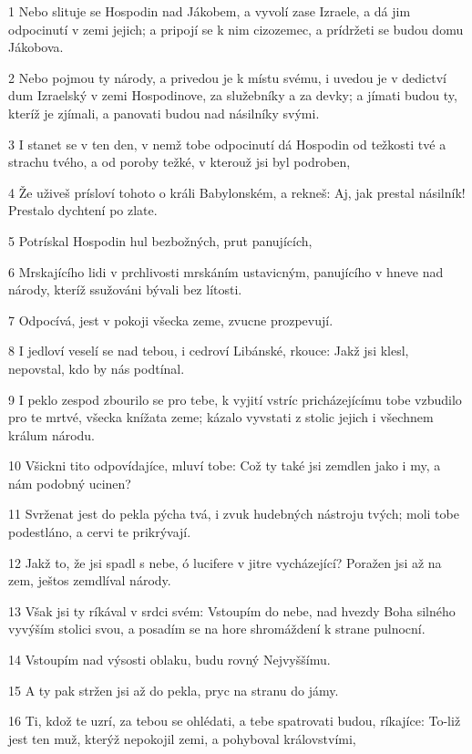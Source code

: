 \par 1 Nebo slituje se Hospodin nad Jákobem, a vyvolí zase Izraele, a dá jim odpocinutí v zemi jejich; a pripojí se k nim cizozemec, a prídržeti se budou domu Jákobova.
\par 2 Nebo pojmou ty národy, a privedou je k místu svému, i uvedou je v dedictví dum Izraelský v zemi Hospodinove, za služebníky a za devky; a jímati budou ty, kteríž je zjímali, a panovati budou nad násilníky svými.
\par 3 I stanet se v ten den, v nemž tobe odpocinutí dá Hospodin od težkosti tvé a strachu tvého, a od poroby težké, v kterouž jsi byl podroben,
\par 4 Že uživeš prísloví tohoto o králi Babylonském, a rekneš: Aj, jak prestal násilník! Prestalo dychtení po zlate.
\par 5 Potrískal Hospodin hul bezbožných, prut panujících,
\par 6 Mrskajícího lidi v prchlivosti mrskáním ustavicným, panujícího v hneve nad národy, kteríž ssužováni bývali bez lítosti.
\par 7 Odpocívá, jest v pokoji všecka zeme, zvucne prozpevují.
\par 8 I jedloví veselí se nad tebou, i cedroví Libánské, rkouce: Jakž jsi klesl, nepovstal, kdo by nás podtínal.
\par 9 I peklo zespod zbourilo se pro tebe, k vyjití vstríc pricházejícímu tobe vzbudilo pro te mrtvé, všecka knížata zeme; kázalo vyvstati z stolic jejich i všechnem králum národu.
\par 10 Všickni tito odpovídajíce, mluví tobe: Což ty také jsi zemdlen jako i my, a nám podobný ucinen?
\par 11 Svrženat jest do pekla pýcha tvá, i zvuk hudebných nástroju tvých; moli tobe podestláno, a cervi te prikrývají.
\par 12 Jakž to, že jsi spadl s nebe, ó lucifere v jitre vycházející? Poražen jsi až na zem, ještos zemdlíval národy.
\par 13 Však jsi ty ríkával v srdci svém: Vstoupím do nebe, nad hvezdy Boha silného vyvýším stolici svou, a posadím se na hore shromáždení k strane pulnocní.
\par 14 Vstoupím nad výsosti oblaku, budu rovný Nejvyššímu.
\par 15 A ty pak stržen jsi až do pekla, pryc na stranu do jámy.
\par 16 Ti, kdož te uzrí, za tebou se ohlédati, a tebe spatrovati budou, ríkajíce: To-liž jest ten muž, kterýž nepokojil zemi, a pohyboval královstvími,
